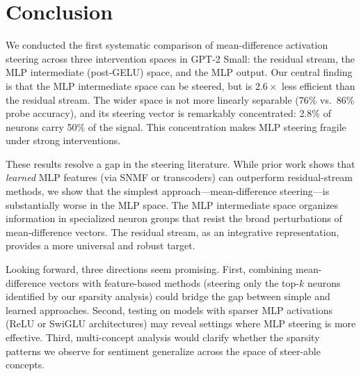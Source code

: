 \section{Conclusion}
\label{sec:conclusion}

We conducted the first systematic comparison of mean-difference activation steering across three intervention spaces in GPT-2 Small: the residual stream, the MLP intermediate (post-GELU) space, and the MLP output. Our central finding is that the MLP intermediate space can be steered, but is $2.6\times$ less efficient than the residual stream. The wider space is not more linearly separable (76\% vs.\ 86\% probe accuracy), and its steering vector is remarkably concentrated: 2.8\% of neurons carry 50\% of the signal. This concentration makes MLP steering fragile under strong interventions.

These results resolve a gap in the steering literature. While prior work shows that \emph{learned} MLP features (via SNMF or transcoders) can outperform residual-stream methods, we show that the simplest approach---mean-difference steering---is substantially worse in the MLP space. The MLP intermediate space organizes information in specialized neuron groups that resist the broad perturbations of mean-difference vectors. The residual stream, as an integrative representation, provides a more universal and robust target.

Looking forward, three directions seem promising. First, combining mean-difference vectors with feature-based methods (\eg steering only the top-$k$ neurons identified by our sparsity analysis) could bridge the gap between simple and learned approaches. Second, testing on models with sparser MLP activations (ReLU or SwiGLU architectures) may reveal settings where MLP steering is more effective. Third, multi-concept analysis would clarify whether the sparsity patterns we observe for sentiment generalize across the space of steer-able concepts.
